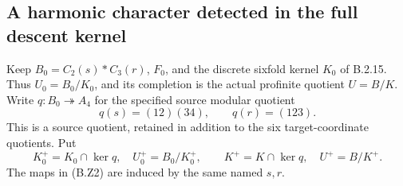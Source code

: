 \subsection{A harmonic character detected in the full descent kernel}

Keep $B_0=C_2(s)*C_3(r)$, $F_0$, and the discrete sixfold
kernel $K_0$ of B.2.15.  Thus $U_0=B_0/K_0$, and its
completion is the actual profinite quotient $U=B/K$.
Write $q:B_0\twoheadrightarrow A_4$ for the specified
source modular quotient
\[
 q(s)=(12)(34),\qquad q(r)=(123).
 \tag{B.Z1}
\]
This is a source quotient, retained in addition to the
six target-coordinate quotients.  Put
\[
 K_0^+=K_0\cap\ker q,\quad U_0^+=B_0/K_0^+,
 \qquad K^+=K\cap\ker q,\quad U^+=B/K^+.
 \tag{B.Z2}
\]
The maps in (B.Z2) are induced by the same named $s,r$.

